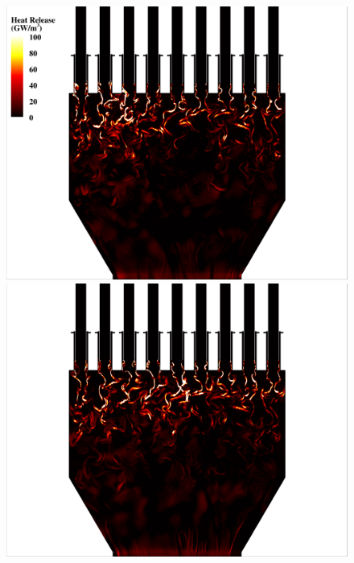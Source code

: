 \begin{figure}
	\begin{minipage}{0.49\linewidth}
		\includegraphics[width=0.99\linewidth,trim={0.5em 0.5em 15em 0.5em},clip]{Chapters/HPROMResults/Images/nineElem/example_snaps/example_heat_z.png}
	\end{minipage}
	\begin{minipage}{0.49\linewidth}
		\includegraphics[width=0.99\linewidth,trim={15em 0.5em 0.5em 0.5em},clip]{Chapters/HPROMResults/Images/nineElem/example_snaps/example_heat_z_217000.png}
	\end{minipage}


\end{figure}
